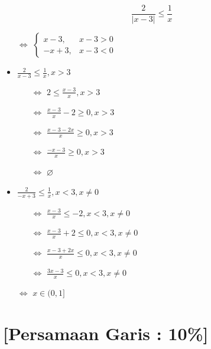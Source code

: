 \documentclass[12pt, a4paper]{article}
\begin{document}
    \[\frac{2}{|x-3|} \le \frac{1}{x}\]
    \begin{itemize}
        \item[$\Leftrightarrow$] $\left\{ \begin{array}{rcl}x-3,& x-3> 0 \\ -x+3,& x-3 < 0\end{array}\right.$
        \item $\frac{2}{x-3} \leq \frac{1}{x},x> 3$
        \begin{itemize}
            \item[$\Leftrightarrow$] $2\le \frac{x-3}{x},x> 3$
            \item[$\Leftrightarrow$] $\frac{x-3}{x}-2\ge 0,x> 3$
            \item[$\Leftrightarrow$] $\frac{x-3-2x}{x}\ge 0,x> 3$
            \item[$\Leftrightarrow$] $\frac{-x-3}{x}\ge 0,x> 3$
            \item[$\Leftrightarrow$] $\varnothing$
        \end{itemize}
        \item $\frac{2}{-x+3} \leq \frac{1}{x},x< 3, x\neq 0$
        \begin{itemize}
            \item[$\Leftrightarrow$] $\frac{x-3}{x}\le -2,x< 3, x\neq 0$
            \item[$\Leftrightarrow$] $\frac{x-3}{x}+2\le 0,x< 3, x\neq 0$
            \item[$\Leftrightarrow$] $\frac{x-3+2x}{x}\le 0,x< 3, x\neq 0$
            \item[$\Leftrightarrow$] $\frac{3x-3}{x}\le 0,x< 3, x\neq 0$
            \item[] 
        \end{itemize}
        \item[$\Leftrightarrow$] $x \in (0,1]$
    \end{itemize}
    \pagebreak

    \section{[{\bf Persamaan Garis} : 10\%]} 
    
\end{document}
